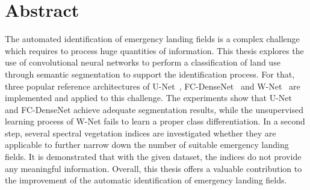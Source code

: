 \section*{Abstract}
\noindent
The automated identification of emergency landing fields is a complex challenge which requires to process huge quantities of information. This thesis explores the use of convolutional neural networks to perform a classification of land use through semantic segmentation to support the identification process. For that, three popular reference architectures of U-Net~\cite{unet15}, FC-DenseNet~\cite{denseseg17} and W-Net~\cite{wnet17} are implemented and applied to this challenge. The experiments show that U-Net and FC-DenseNet achieve adequate segmentation results, while the unsupervised learning process of W-Net fails to learn a proper class differentiation. In a second step, several spectral vegetation indices are investigated whether they are applicable to further narrow down the number of suitable emergency landing fields. It is demonstrated that with the given dataset, the indices do not provide any meaningful information. Overall, this thesis offers a valuable contribution to the improvement of the automatic identification of emergency landing fields.